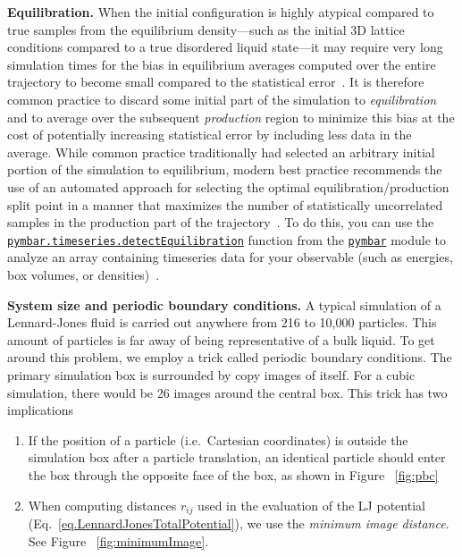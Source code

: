 \documentclass[aip,jcp,preprint,superscriptaddress,floatfix]{revtex4-1}
\begin{document}
\textbf{Equilibration.} 
When the initial configuration is highly atypical compared to true samples from the equilibrium density---such as the initial 3D lattice conditions compared to a true disordered liquid state---it may require very long simulation times for the bias in equilibrium averages computed over the entire trajectory to become small compared to the statistical error~\cite{Chodera.JCTC.12.1799.2016}.
It is therefore common practice to discard some initial part of the simulation to \emph{equilibration} and to average over the subsequent \emph{production} region to minimize this bias at the cost of potentially increasing statistical error by including less data in the average.
While common practice traditionally had selected an arbitrary initial portion of the simulation to equilibrium, modern best practice recommends the use of an automated approach for selecting the optimal equilibration/production split point in a manner that maximizes the number of statistically uncorrelated samples in the production part of the trajectory~\cite{Chodera.JCTC.12.1799.2016}.
To do this, you can use the \href{http://pymbar.readthedocs.io/en/latest/timeseries.html#automatically-identifying-the-equilibrated-production-region}{\tt pymbar.timeseries.detectEquilibration} function from the \href{http://pymbar.org/}{\tt pymbar} module to analyze an array containing timeseries data for your observable (such as energies, box volumes, or densities)~\cite{Chodera.JCTC.12.1799.2016}.

\textbf{System size and periodic boundary conditions.} 
A typical simulation of a Lennard-Jones fluid is carried out anywhere from 216 to 10,000 particles. 
This amount of particles is far away of being representative of a bulk liquid. 
To get around this problem, we employ a trick called periodic boundary conditions. 
The primary simulation box is surrounded
by copy images of itself. For a cubic simulation, there would be 26 
images around the central box. This trick has two implications
\begin{enumerate}
\setlength{\itemsep}{0em} %
	\item If the position of a particle (i.e.\ Cartesian coordinates) is
		outside the simulation box after a particle translation, 
		an identical particle should enter the box through the
		opposite face of the box, as shown in Figure ~\ref{fig:pbc} 
	\item When computing distances $r_{ij}$ used in the evaluation of the LJ potential (Eq.~\ref{eq.LennardJonesTotalPotential}), we use the \textit{minimum image distance}. See Figure ~\ref{fig:minimumImage}.
\end{enumerate}
\end{document}
